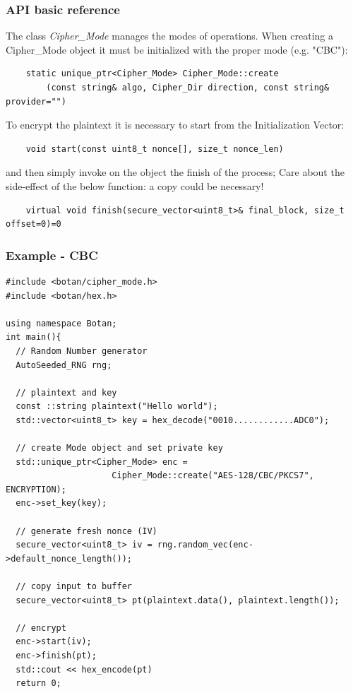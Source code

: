 \subsubsection*{API basic reference}
The class \textit{Cipher\_Mode} manages the modes of operations. 
When creating a Cipher\_Mode object it must be initialized with the proper mode (e.g. "CBC"):
\begin{verbatim}
    static unique_ptr<Cipher_Mode> Cipher_Mode::create
        (const string& algo, Cipher_Dir direction, const string& provider="")
\end{verbatim}
To encrypt the plaintext it is necessary to start from the Initialization Vector:
\begin{verbatim}
    void start(const uint8_t nonce[], size_t nonce_len)
\end{verbatim}
and then simply invoke on the object the finish of the process; Care about the side-effect of the below function: a copy could be necessary!
\begin{verbatim}
    virtual void finish(secure_vector<uint8_t>& final_block, size_t offset=0)=0
\end{verbatim}

\subsubsection*{Example - CBC}
\begin{verbatim}
#include <botan/cipher_mode.h>
#include <botan/hex.h>

using namespace Botan;
int main(){
  // Random Number generator
  AutoSeeded_RNG rng;

  // plaintext and key
  const ::string plaintext("Hello world");
  std::vector<uint8_t> key = hex_decode("0010............ADC0");

  // create Mode object and set private key
  std::unique_ptr<Cipher_Mode> enc = 
                     Cipher_Mode::create("AES-128/CBC/PKCS7", ENCRYPTION);
  enc->set_key(key);

  // generate fresh nonce (IV)
  secure_vector<uint8_t> iv = rng.random_vec(enc->default_nonce_length());

  // copy input to buffer
  secure_vector<uint8_t> pt(plaintext.data(), plaintext.length());

  // encrypt 
  enc->start(iv);
  enc->finish(pt);
  std::cout << hex_encode(pt)
  return 0;
\end{verbatim}
